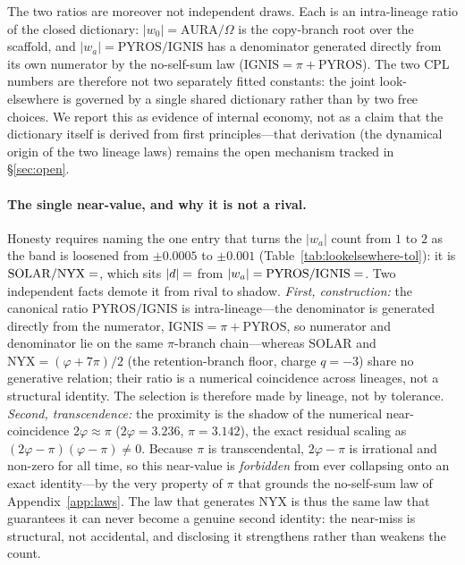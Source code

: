 \documentclass[aps,prd,preprint,amsmath,amssymb,nofootinbib,longbibliography]{revtex4-2}
\begin{document}
The two ratios are moreover not independent draws. Each is an intra-lineage
ratio of the closed dictionary: $|w_0|=\mathrm{AURA}/\Omega$ is the copy-branch
root over the scaffold, and $|w_a|=\mathrm{PYROS}/\mathrm{IGNIS}$ has a
denominator generated directly from its own numerator by the no-self-sum law
($\mathrm{IGNIS}=\pi+\mathrm{PYROS}$). The two CPL numbers are
therefore not two separately fitted constants: the joint look-elsewhere is
governed by a single shared dictionary rather than by two free choices. We report this as
evidence of internal economy, not as a claim that the dictionary itself is
derived from first principles---that derivation (the dynamical origin of the
two lineage laws) remains the open mechanism tracked in \S\ref{sec:open}.

\paragraph{The single near-value, and why it is not a rival.} Honesty requires
naming the one entry that turns the $|w_a|$ count from $1$ to $2$ as the band is
loosened from $\pm0.0005$ to $\pm0.001$ (Table~\ref{tab:lookelsewhere-tol}): it is
$\mathrm{SOLAR}/\mathrm{NYX}=\val{SOLAR_NYX_d5}$, which sits $|d|=\val{solarnyx_d}$ from
$|w_a|=\mathrm{PYROS}/\mathrm{IGNIS}=\val{WA_abs_d6}$. Two independent facts demote it from
rival to shadow. \emph{First, construction:} the canonical ratio
$\mathrm{PYROS}/\mathrm{IGNIS}$ is intra-lineage---the denominator is generated
directly from the numerator, $\mathrm{IGNIS}=\pi+\mathrm{PYROS}$, so numerator and
denominator lie on the same $\pi$-branch chain---whereas $\mathrm{SOLAR}$ and
$\mathrm{NYX}=(\varphi+7\pi)/2$ (the retention-branch floor, charge $q=-3$) share
no generative relation; their ratio is a numerical coincidence across lineages, not a
structural identity. The selection is therefore made by lineage, not by tolerance. \emph{Second, transcendence:} the
proximity is the shadow of the numerical near-coincidence $2\varphi\approx\pi$
($2\varphi=3.236$, $\pi=3.142$), the exact residual scaling as
$(2\varphi-\pi)(\varphi-\pi)\neq0$. Because $\pi$ is transcendental, $2\varphi-\pi$
is irrational and non-zero for all time, so this near-value is \emph{forbidden}
from ever collapsing onto an exact identity---by the very property of $\pi$ that
grounds the no-self-sum law of Appendix~\ref{app:laws}. The law that generates
$\mathrm{NYX}$ is thus the same law that guarantees it can never become a genuine
second identity: the near-miss is structural, not accidental, and disclosing it
strengthens rather than weakens the count.
\end{document}
